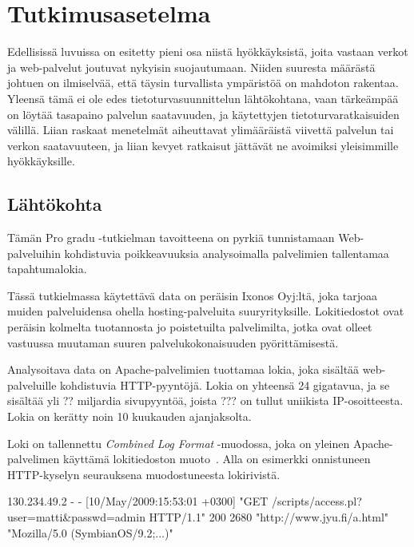 
\chapter{Tutkimusasetelma}

Edellisissä luvuissa on esitetty pieni osa niistä hyökkäyksistä, joita vastaan verkot ja web-palvelut joutuvat nykyisin suojautumaan. Niiden suuresta määrästä johtuen on ilmiselvää, että täysin 
turvallista ympäristöä on mahdoton rakentaa. Yleensä tämä ei ole edes tietoturvasuunnittelun lähtökohtana, vaan tärkeämpää on löytää tasapaino palvelun saatavuuden, ja käytettyjen tietoturvaratkaisuiden 
välillä. Liian raskaat menetelmät aiheuttavat ylimääräistä viivettä palvelun tai verkon saatavuuteen, ja liian kevyet ratkaisut jättävät ne avoimiksi yleisimmille hyökkäyksille. 

\section{Lähtökohta}
\label{sec:lahtokohta}

Tämän Pro gradu -tutkielman tavoitteena on pyrkiä tunnistamaan Web-palveluihin kohdistuvia poikkeavuuksia analysoimalla palvelimien tallentamaa tapahtumalokia.

Tässä tutkielmassa käytettävä data on peräisin Ixonos Oyj:ltä, joka tarjoaa muiden palveluidensa ohella hosting-palveluita suuryrityksille. Lokitiedostot ovat peräisin kolmelta tuotannosta jo poistetuilta palvelimilta, jotka ovat olleet vastuussa muutaman suuren palvelukokonaisuuden pyörittämisestä.

Analysoitava data on Apache-palvelimien tuottamaa lokia, joka sisältää
web-palveluille kohdistuvia HTTP-pyyntöjä. Lokia on yhteensä 24
gigatavua, ja se sisältää yli ?? miljardia sivupyyntöä, joista ??? on
tullut uniikista IP-osoitteesta. Lokia on kerätty noin 10 kuukauden
ajanjaksolta. 

Loki on tallennettu \textit{Combined Log Format} -muodossa,
joka on yleinen Apache-palvelimen käyttämä lokitiedoston
muoto~\cite{combined}. Alla on esimerkki onnistuneen HTTP-kyselyn seurauksena muodostuneesta lokirivistä.

\begin{framed}
\begin{verbatim*}
130.234.49.2 - - [10/May/2009:15:53:01 +0300]
"GET /scripts/access.pl?user=matti&passwd=admin HTTP/1.1"
200 2680 "http://www.jyu.fi/a.html"
"Mozilla/5.0 (SymbianOS/9.2;...)"
\end{verbatim*}
\end{framed}

